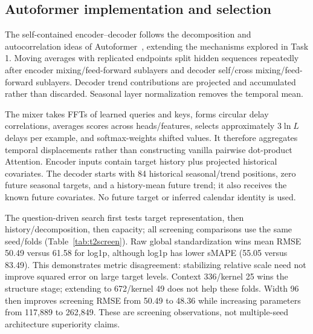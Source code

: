 \documentclass[11pt,a4paper]{article}
\begin{document}
\subsection*{Autoformer implementation and selection}
The self-contained encoder--decoder follows the decomposition and autocorrelation ideas of Autoformer~\cite{autoformer}, extending the mechanisms explored in Task 1. Moving averages with replicated endpoints split hidden sequences repeatedly after encoder mixing/feed-forward sublayers and decoder self/cross mixing/feed-forward sublayers. Decoder trend contributions are projected and accumulated rather than discarded. Seasonal layer normalization removes the temporal mean.

The mixer takes FFTs of learned queries and keys, forms circular delay correlations, averages scores across heads/features, selects approximately $3\ln L$ delays per example, and softmax-weights shifted values. It therefore aggregates temporal displacements rather than constructing vanilla pairwise dot-product Attention. Encoder inputs contain target history plus projected historical covariates. The decoder starts with 84 historical seasonal/trend positions, zero future seasonal targets, and a history-mean future trend; it also receives the known future covariates. No future target or inferred calendar identity is used.

The question-driven search first tests target representation, then history/decomposition, then capacity; all screening comparisons use the same seed/folds (Table~\ref{tab:t2screen}). Raw global standardization wins mean RMSE 50.49 versus 61.58 for log1p, although log1p has lower sMAPE (55.05 versus 83.49). This demonstrates metric disagreement: stabilizing relative scale need not improve squared error on large target levels. Context 336/kernel 25 wins the structure stage; extending to 672/kernel 49 does not help these folds. Width 96 then improves screening RMSE from 50.49 to 48.36 while increasing parameters from 117,889 to 262,849. These are screening observations, not multiple-seed architecture superiority claims.
\end{document}
